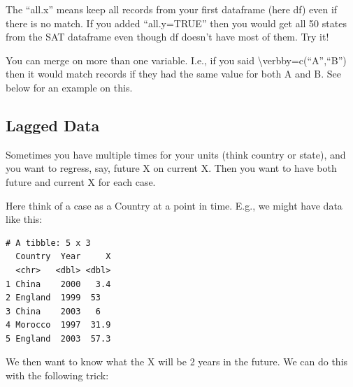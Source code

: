 \documentclass[
  letterpaper,
  DIV=11,
  numbers=noendperiod]{scrreprt}
\newenvironment{Shaded}{\begin{snugshade}}{\end{snugshade}}
\newcommand{\AttributeTok}[1]{\textcolor[rgb]{0.49,0.56,0.16}{#1}}
\newcommand{\ConstantTok}[1]{\textcolor[rgb]{0.53,0.00,0.00}{#1}}
\newcommand{\DecValTok}[1]{\textcolor[rgb]{0.25,0.63,0.44}{#1}}
\newcommand{\FunctionTok}[1]{\textcolor[rgb]{0.02,0.16,0.49}{#1}}
\newcommand{\NormalTok}[1]{\textcolor[rgb]{0.00,0.44,0.13}{#1}}
\newcommand{\OtherTok}[1]{\textcolor[rgb]{0.00,0.44,0.13}{#1}}
\newcommand{\SpecialCharTok}[1]{\textcolor[rgb]{0.25,0.44,0.63}{#1}}
\newcommand{\StringTok}[1]{\textcolor[rgb]{0.25,0.44,0.63}{#1}}
\begin{document}
The ``all.x'' means keep all records from your first dataframe (here df)
even if there is no match. If you added ``all.y=TRUE'' then you would
get all 50 states from the SAT dataframe even though df doesn't have
most of them. Try it!

You can merge on more than one variable. I.e., if you said
\textbackslash verb\textbar by=c(``A'',``B'')\textbar{} then it would
match records if they had the same value for both A and B. See below for
an example on this.

\hypertarget{lagged-data}{%
\subsection{Lagged Data}\label{lagged-data}}

Sometimes you have multiple times for your units (think country or
state), and you want to regress, say, future X on current X. Then you
want to have both future and current X for each case.

Here think of a case as a Country at a point in time. E.g., we might
have data like this:

\begin{Shaded}
\end{Shaded}

\begin{verbatim}
# A tibble: 5 x 3
  Country  Year     X
  <chr>   <dbl> <dbl>
1 China    2000   3.4
2 England  1999  53  
3 China    2003   6  
4 Morocco  1997  31.9
5 England  2003  57.3
\end{verbatim}

We then want to know what the X will be 2 years in the future. We can do
this with the following trick:
\end{document}
